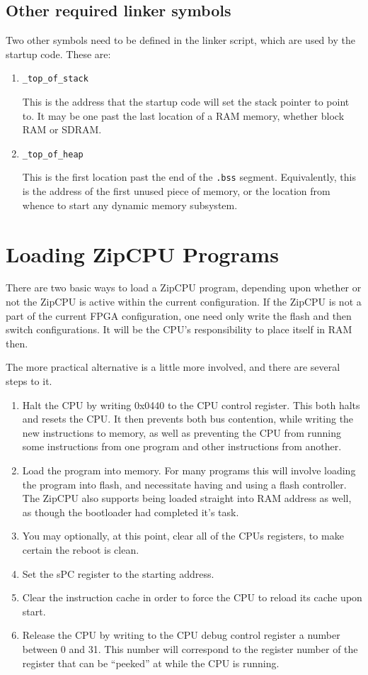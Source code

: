 \documentclass{gqtekspec}
\begin{document}
\subsection{Other required linker symbols}\label{sec:ld-other}

Two other symbols need to be defined in the linker script, which are used
by the startup code.  These are:
\begin{enumerate}
\item {\tt \_top\_of\_stack}

	This is the address that the startup code will set the stack pointer
	to point to.  It may be one past the last location of a RAM memory,
	whether block RAM or SDRAM.

\item {\tt \_top\_of\_heap}

	This is the first location past the end of the {\tt .bss} segment.
	Equivalently, this is the address of the first unused piece of
	memory, or the location from whence to start any dynamic memory
	subsystem.
\end{enumerate}

\section{Loading ZipCPU Programs}
There are two basic ways to load a ZipCPU program, depending upon whether or
not the ZipCPU is active within the current configuration.  If the ZipCPU
is not a part of the current FPGA configuration, one need only write the 
flash and then switch configurations.  It will be the CPU's responsibility
to place itself in RAM then. 

The more practical alternative is a little more involved, and there are
several steps to it.
\begin{enumerate}
\item Halt the CPU by writing 0x0440 to the CPU control register.  This
	both halts and resets the CPU.  It then prevents both bus contention,
	while writing the new instructions to memory, as well as preventing the
	CPU from running some instructions from one program and other
	instructions from another.
\item Load the program into memory.  For many programs this will involve
	loading the program into flash, and necessitate having and using a 
	flash controller.  The ZipCPU also supports being loaded straight into
	RAM address as well, as though the bootloader had completed
	it's task.
\item You may optionally, at this point, clear all of the CPUs registers,
	to make certain the reboot is clean.
\item Set the sPC register to the starting address. 
\item Clear the instruction cache in order to force the CPU to reload its
	cache upon start.
\item Release the CPU by writing to the CPU debug control register a number
	between 0 and 31.  This number will correspond to the register number
	of the register that can be ``peeked'' at while the CPU is running.
\end{enumerate}
\end{document}
